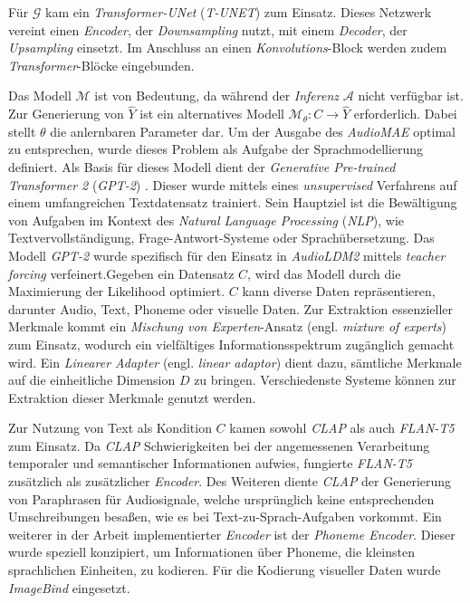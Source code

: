 \documentclass[
  a4paper,  %
  twoside,  %
  bibliography=totoc,
  headsepline,
  cleardoublepage=empty,
  parskip=half,
  draft=false
]{scrbook}
\begin{document}
Für $\mathcal{G}$ kam ein \emph{Transformer-UNet} (\emph{T-UNET}) zum Einsatz. Dieses Netzwerk vereint einen \emph{Encoder}, der \emph{Downsampling} nutzt, mit einem \emph{Decoder}, der \emph{Upsampling} einsetzt. Im Anschluss an einen \emph{Konvolutions}-Block werden zudem \emph{Transformer}-Blöcke eingebunden. \cite{liu_audioldm2_2023}

Das Modell $\mathcal{M}$ ist von Bedeutung, da während der \emph{Inferenz} $\mathcal{A}$ nicht verfügbar ist. Zur Generierung von $\hat{Y}$ ist ein alternatives Modell $\mathcal{M}_\theta: C \rightarrow \hat{Y}$ erforderlich. Dabei stellt $\theta$ die anlernbaren Parameter dar. Um der Ausgabe des \emph{AudioMAE} optimal zu entsprechen, wurde dieses Problem als Aufgabe der Sprachmodellierung definiert. Als Basis für dieses Modell dient der \emph{Generative Pre-trained Transformer 2} (\emph{GPT-2}) \cite{alec_radford_jeff_wu_rewon_child_david_luan_dario_amodei_ilya_sutskever_language_2019}. Dieser wurde mittels eines \emph{unsupervised} Verfahrens auf einem umfangreichen Textdatensatz trainiert. Sein Hauptziel ist die Bewältigung von Aufgaben im Kontext des \emph{Natural Language Processing} (\emph{NLP}), wie Textvervollständigung, Frage-Antwort-Systeme oder Sprachübersetzung. Das Modell \emph{GPT-2} wurde spezifisch für den Einsatz in \emph{AudioLDM2} mittels \emph{teacher forcing} \cite{kolen_field_2001} verfeinert.Gegeben ein Datensatz $C$, wird das Modell durch die Maximierung der Likelihood optimiert. $C$ kann diverse Daten repräsentieren, darunter Audio, Text, Phoneme oder visuelle Daten. Zur Extraktion essenzieller Merkmale kommt ein \emph{Mischung von Experten}-Ansatz (engl. \emph{mixture of experts}) \cite{masoudnia_mixture_2014} zum Einsatz, wodurch ein vielfältiges Informationsspektrum zugänglich gemacht wird. Ein \emph{Linearer Adapter} (engl. \emph{linear adaptor}) dient dazu, sämtliche Merkmale auf die einheitliche Dimension $D$ zu bringen. Verschiedenste Systeme können zur Extraktion dieser Merkmale genutzt werden. \cite{liu_audioldm2_2023}

Zur Nutzung von Text als Kondition $C$ kamen sowohl \emph{CLAP} \cite{wu_large-scale_2023} als auch \emph{FLAN-T5} \cite{chung_scaling_2022} zum Einsatz. Da \emph{CLAP} Schwierigkeiten bei der angemessenen Verarbeitung temporaler und semantischer Informationen aufwies, fungierte \emph{FLAN-T5} zusätzlich als zusätzlicher \emph{Encoder}. Des Weiteren diente \emph{CLAP} der Generierung von Paraphrasen für Audiosignale, welche ursprünglich keine entsprechenden Umschreibungen besaßen, wie es bei Text-zu-Sprach-Aufgaben vorkommt. Ein weiterer in der Arbeit implementierter \emph{Encoder} ist der \emph{Phoneme Encoder}. Dieser wurde speziell konzipiert, um Informationen über Phoneme, die kleinsten sprachlichen Einheiten, zu kodieren. Für die Kodierung visueller Daten wurde \emph{ImageBind} \cite{girdhar_imagebind_2023} eingesetzt. \cite{liu_audioldm2_2023}
\end{document}
